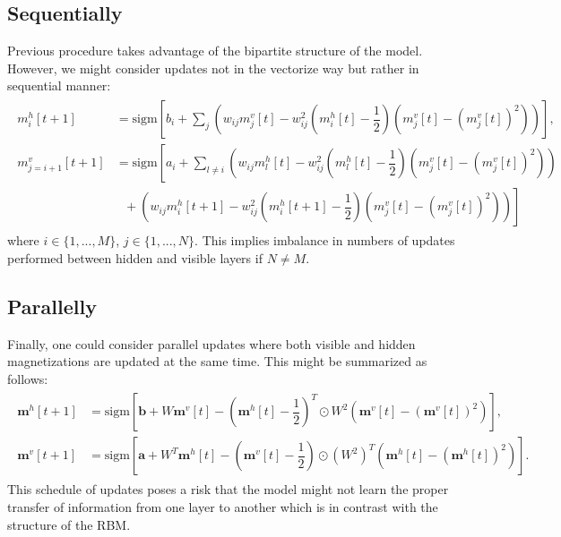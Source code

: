 \subsection{Sequentially}
Previous procedure takes advantage of the bipartite structure of the model. However, we might consider updates not in the vectorize way but rather in sequential manner: 
\begin{align}
\begin{split}
m_i^{h}[t+1] & = \text{sigm} \left[b_i + \sum_j \left( w_{ij}m_j^{v}[t] - w_{ij}^2  (m_i^h[t] - \dfrac{1}{2}) \left(m_j^v[t] - (m_j^v[t])^2 \right)  \right)\right],  \\
m_{j = i+1}^v[t+1] & = \text{sigm} \left[ a_i + \sum_{l \neq i} \left( w_{ij}m_l^{h}[t] - w_{ij}^2  (m_l^h[t] - \dfrac{1}{2}) (m_j^v[t] - (m_j^v[t])^2)  \right)  \right.\\
& ~~~ + \left. \left( w_{ij}m_i^{h}[t +1] - w_{ij}^2  (m_i^h[t+1] - \dfrac{1}{2}) (m_j^v[t] - (m_j^v[t])^2)  \right) \right]
\end{split}
\label{eq:sequential}
\end{align}
where $i \in \{1, ..., M\}$, $j \in \{1,..., N \}$. This implies imbalance in numbers of updates performed between hidden and visible layers if $N \neq M$.

\subsection{Parallelly}
Finally, one could consider parallel updates where both visible and hidden magnetizations are updated at the same time. This might be summarized as follows:
\begin{align}
\begin{split}
\mathbf{m}^h[t+1] & = \text{sigm} \left[  \mathbf{b} + W \mathbf{m}^v[t] - \left( \mathbf{m}^h[t] - \dfrac{1}{2}\right)^T \odot W^2 \left( \mathbf{m}^v[t] - ( \mathbf{m}^v[t])^2 \right) \right], \\
\mathbf{m}^v[t+1] & = \text{sigm} \left[  \mathbf{a} + W^T \mathbf{m}^h[t] -\left( \mathbf{m}^v[t] - \dfrac{1}{2}\right) \odot (W^2)^T  \left(\mathbf{m}^h[t] - (\mathbf{m}^h[t])^2 \right) \right].
\end{split}
\end{align}
This schedule of updates poses a risk that the model might not learn the proper transfer of information from one layer to another which is in contrast with the structure of the RBM.

